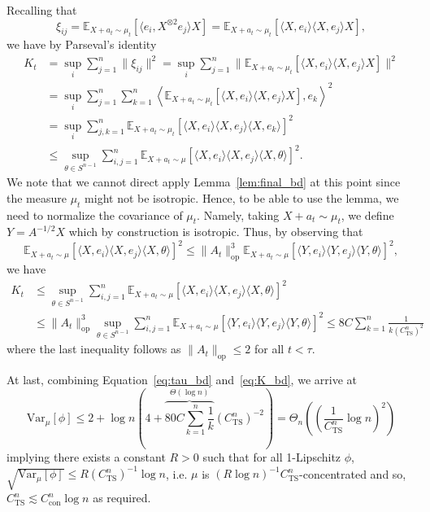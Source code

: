 Recalling that
\[\xi_{ij} = \mathbb{E}_{X + a_t \sim \mu_t}[\langle e_i, X^{\otimes 2} e_j\rangle X] = 
  \mathbb{E}_{X + a_t \sim \mu_t}[\langle X, e_i\rangle \langle X, e_j\rangle X],\]
we have by Parseval's identity 
\begin{align*}
  K_t & = \sup_i \sum_{j = 1}^n \|\xi_{ij}\|^2 
    = \sup_i \sum_{j = 1}^n \|\mathbb{E}_{X + a_t \sim \mu_t}[\langle X, e_i\rangle \langle X, e_j\rangle X]\|^2\\
  & = \sup_i \sum_{j = 1}^n \sum_{k = 1}^n 
    \left\langle \mathbb{E}_{X + a_t \sim \mu_t}[\langle X, e_i\rangle \langle X, e_j\rangle X], e_k\right\rangle^2\\
  & = \sup_i \sum_{j, k = 1}^n \mathbb{E}_{X + a_t \sim \mu_t}[\langle X, e_i\rangle \langle X, e_j\rangle \langle X, e_k\rangle]^2\\
  & \le \sup_{\theta \in S^{n - 1}}\sum_{i, j = 1}^n 
    \mathbb{E}_{X + a_t \sim \mu}[\langle X, e_i\rangle \langle X, e_j\rangle \langle X, \theta\rangle]^2.
\end{align*}
We note that we cannot direct apply Lemma~\ref{lem:final_bd} at this point since the measure \(\mu_t\) 
might not be isotropic. Hence, to be able to use the lemma, we need to normalize the covariance of \(\mu_t\). 
Namely, taking \(X + a_t \sim \mu_t\), we define \(Y = A^{-1/2} X\) which by construction is isotropic. 
Thus, by observing that 
\[\mathbb{E}_{X + a_t \sim \mu}[\langle X, e_i\rangle \langle X, e_j\rangle \langle X, \theta\rangle]^2 
  \le \|A_t\|_{\text{op}}^3 \mathbb{E}_{X + a_t \sim \mu}[\langle Y, e_i\rangle \langle Y, e_j\rangle \langle Y, \theta\rangle]^2,\]
we have 
\begin{equation}\label{eq:K_bd}
  \begin{split}
    K_t & \le \sup_{\theta \in S^{n - 1}}\sum_{i, j = 1}^n 
        \mathbb{E}_{X + a_t \sim \mu}[\langle X, e_i\rangle \langle X, e_j\rangle \langle X, \theta\rangle]^2\\
      & \le \|A_t\|_{\text{op}}^3 \sup_{\theta \in S^{n - 1}}\sum_{i, j = 1}^n 
        \mathbb{E}_{X + a_t \sim \mu}[\langle Y, e_i\rangle \langle Y, e_j\rangle \langle Y, \theta\rangle]^2
        \le 8 C \sum_{k = 1}^n \frac{1}{k(C_{\text{TS}}^n)^2}
      \end{split}
\end{equation}
where the last inequality follows as \(\|A_t\|_{\text{op}} \le 2\) for all \(t < \tau\). 
    
At last, combining Equation~\eqref{eq:tau_bd} and~\eqref{eq:K_bd}, we arrive at
\[\text{Var}_\mu[\phi] \le 2 + \log n\left(4 + \overbrace{80 C \sum_{k = 1}^n \frac{1}{k}}^{\Theta(\log n)}(C_{\text{TS}}^n)^{-2}\right)
   = \Theta_n\left(\left(\frac{1}{C_{\text{TS}}^n} \log n\right)^2\right)\]
implying there exists a constant \(R > 0\) such that for all 1-Lipschitz \(\phi\), 
\(\sqrt{\text{Var}_\mu[\phi]} \le R (C_{\text{TS}}^n)^{-1} \log n\), i.e. \(\mu\) is 
\((R\log n)^{-1} C_{\text{TS}}^n\)-concentrated and so, \(C_{\text{TS}}^n \lesssim C_{\text{con}}^n \log n\)
as required.


